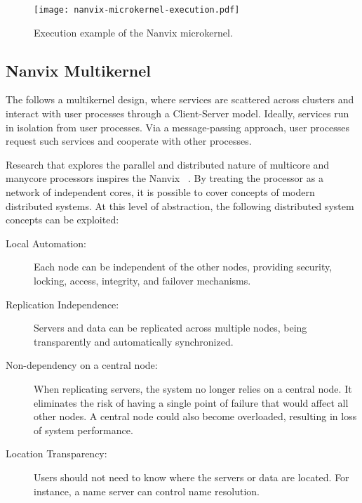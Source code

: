 		\begin{figure}[!tb]
			\centering%
			\caption{Execution example of the Nanvix microkernel.}%
			\label{fig:microkernel-execution}%
			\texttt{[image: nanvix-microkernel-execution.pdf]}%
		\end{figure}

	\subsection{Nanvix Multikernel}
	\label{sec.multikernel}

		The \textit{\nanvix \multikernel} follows a multikernel design, where \os services
		are scattered across clusters and interact with user processes through a
		Client-Server model.
		Ideally, \os services run in isolation from user processes.
		Via a message-passing approach, user processes request such services and
		cooperate with other processes.

		Research that explores the parallel and distributed nature of multicore and
		manycore processors inspires the Nanvix \multikernel~\cite{wentzlaff_factored_2009, baumann_multikernel:_2009, Wisniewski2014}.
		By treating the processor as a network of independent cores, it is possible
		to cover concepts of modern distributed systems.
		At this level of abstraction, the following distributed system concepts can be exploited:

		\begin{description}

			\item[Local Automation:] Each node can be independent of the other nodes, providing
				security, locking, access, integrity, and failover mechanisms.

			\item[Replication Independence:] Servers and data can be replicated across multiple
				nodes, being transparently and automatically synchronized.

			\item[Non-dependency on a central node:] When replicating servers, the system no
				longer relies on a central node.
				It eliminates the risk of having a single point of failure that would affect all other nodes.
				A central node could also become overloaded, resulting in loss of system performance.

			\item[Location Transparency:] Users should not need to know where the servers
				or data are located. For instance, a name server can control name resolution.

		\end{description}

